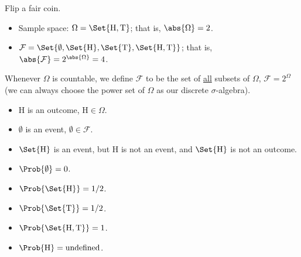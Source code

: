 \begin{Example}{}{}
    Flip a fair coin.
    \begin{itemize}
        \item Sample space: $ \Omega=\Set{\text{H},\text{T}} $;
              that is, $ \abs{\Omega}=2 $.
        \item $ \mathcal{F}=\Set{\emptyset,
                      \Set{\text{H}},\Set{\text{T}},\Set{\text{H},\text{T}}} $;
              that is,
              $ \abs{\mathcal{F}}=2^{\abs{\Omega}}=4 $.
    \end{itemize}
    Whenever $ \Omega $ is countable, we define $ \mathcal{F} $ to be
    the set of \underline{all} subsets of $ \Omega $,
    $ \mathcal{F}=2^{\Omega} $ (we can always choose the power set of $ \Omega $
    as our discrete $ \sigma $-algebra).
    \begin{itemize}
        \item $ \text{H} $ is an outcome, $ \text{H}\in\Omega $.
        \item $ \emptyset $ is an event, $ \emptyset\in\mathcal{F} $.
        \item $ \Set{\text{H}} $ is an event,
              but $ \text{H} $ is not an event, and $ \Set{\text{H}} $
              is not an outcome.
        \item $ \Prob{\emptyset}=0 $.
        \item $ \Prob{\Set{\text{H}}}=1/2 $.
        \item $ \Prob{\Set{\text{T}}}=1/2 $.
        \item $ \Prob{\Set{\text{H},\text{T}}}=1 $.
        \item $ \Prob{\text{H}}=\text{undefined} $.
    \end{itemize}
\end{Example}
